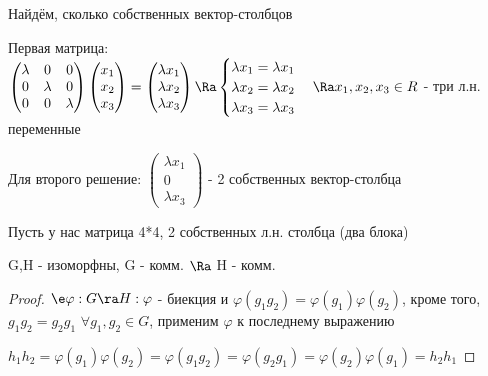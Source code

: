 \documentclass[12pt, fleqn]{article}
\begin{document}
    \begin{example}
        Найдём, сколько собственных вектор-столбцов

        Первая матрица:
        $\begin{pmatrix}
        \lambda & 0 & 0\\
        0 & \lambda & 0\\
        0 & 0 & \lambda
        \end{pmatrix}
        \begin{pmatrix}
        x_1\\
        x_2\\
        x_3
        \end{pmatrix}
        =
        \begin{pmatrix}
        \lambda x_1\\
        \lambda x_2\\
        \lambda x_3
        \end{pmatrix}
        \Ra
        \begin{cases}
        \lambda x_1=\lambda x_1\\
        \lambda x_2=\lambda x_2\\
        \lambda x_3=\lambda x_3
        \end{cases}
        \Ra
        x_1,x_2,x_3 \in R
        $ - три л.н. переменные

        Для второго решение:
        $\begin{pmatrix}
        \lambda x_1\\
        0\\
        \lambda x_3
        \end{pmatrix}$ - 2 собственных вектор-столбца
    \end{example}


    \begin{example}
        Пусть у нас матрица 4*4, 2 собственных л.н. столбца (два блока)
    \end{example}

    \begin{utv}
        G,H - изоморфны, G - комм. $\Ra$ H - комм.
    \end{utv}

    \begin{proof}
        $\e \varphi: G \ra H: \varphi$ - биекция и $\varphi(g_1 g_2)=\varphi(g_1) \varphi(g_2)$, кроме того, $g_1 g_2=g_2 g_1$ $\forall g_1, g_2 \in G$, применим $\varphi$ к последнему выражению

        $h_1 h_2=\varphi(g_1) \varphi(g_2)=\varphi(g_1 g_2)=\varphi(g_2 g_1)=\varphi(g_2) \varphi(g_1)= h_2 h_1$
    \end{proof}
\end{document}

